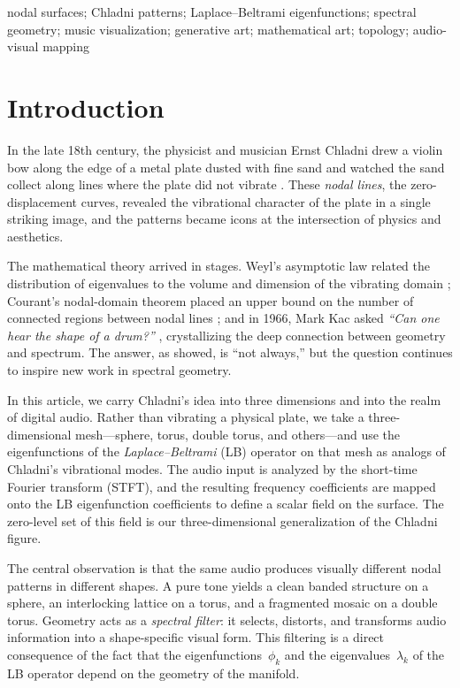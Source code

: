 \documentclass[]{interact}
\theoremstyle{plain}
\theoremstyle{definition}
\theoremstyle{remark}
\begin{document}
\begin{keywords}
nodal surfaces; Chladni patterns; Laplace--Beltrami eigenfunctions;
spectral geometry; music visualization; generative art; mathematical art;
topology; audio-visual mapping
\end{keywords}


\section{Introduction}
\label{sec:intro}

In the late 18th century, the physicist and musician Ernst Chladni drew a violin bow along the edge of a metal plate dusted with fine sand and watched the sand collect along lines where the plate did not vibrate \citep{chladni1787entdeckungen,chladni1830}. These \emph{nodal lines}, the zero-displacement curves, revealed the vibrational character of the plate in a single striking image, and the patterns became icons at the intersection of physics and aesthetics.

The mathematical theory arrived in stages. Weyl's asymptotic law related the distribution of eigenvalues to the volume and dimension of the vibrating domain \citep{jrgens1964}; Courant's nodal-domain theorem placed an upper bound on the number of connected regions between nodal lines \citep{courant1923allgemeiner}; and in 1966, Mark Kac asked \emph{``Can one hear the shape of a drum?''} \citep{kac1966}, crystallizing the deep connection between geometry and spectrum. The answer, as \citet{gordon1992} showed, is ``not always,'' but the question continues to inspire new work in spectral geometry.

In this article, we carry Chladni's idea into three dimensions and into the realm of digital audio. Rather than vibrating a physical plate, we take a three-dimensional mesh---sphere, torus, double torus, and others---and use the eigenfunctions of the \emph{Laplace--Beltrami} (LB) operator on that mesh as analogs of Chladni's vibrational modes. The audio input is analyzed by the short-time Fourier transform (STFT), and the resulting frequency coefficients are mapped onto the LB eigenfunction coefficients to define a scalar field on the surface. The zero-level set of this field is our three-dimensional generalization of the Chladni figure.

The central observation is that the same audio produces visually different nodal patterns in different shapes. A pure tone yields a clean banded structure on a sphere, an interlocking lattice on a torus, and a fragmented mosaic on a double torus. Geometry acts as a \emph{spectral filter}: it selects, distorts, and transforms audio information into a shape-specific visual form. This filtering is a direct consequence of the fact that the eigenfunctions~$\phi_k$ and the eigenvalues~$\lambda_k$ of the LB operator depend on the geometry of the manifold.
\end{document}
